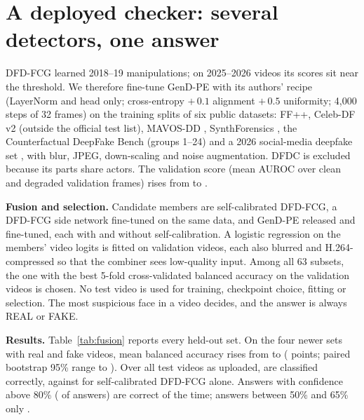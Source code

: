 \documentclass[11pt]{article}
\begin{document}
\begin{table}[t]
  \centering\small
  \caption{Self-calibration applied unchanged to GenD (released FF++ checkpoints). Real videos called fake at 0.5, and
  AUROC, before $\rightarrow$ after. FF++ test: 70 real; DFDC part 0: 40 real. Strong blur = GB$_5$, heavy H.264 =
  VC$_5$ (authors' code).}
  \label{tab:transfer}
  \TabTransfer
\end{table}

\section{A deployed checker: several detectors, one answer}
\label{sec:fusion}
DFD-FCG learned 2018--19 manipulations; on 2025--2026 videos its scores sit near the threshold. We therefore fine-tune
GenD-PE with its authors' recipe (LayerNorm and head only; cross-entropy $+\,0.1$ alignment $+\,0.5$ uniformity; 4{,}000
steps of 32 frames) on the training splits of six public datasets: FF++, Celeb-DF v2 (outside the official test list),
MAVOS-DD \cite{mavosdd}, SynthForensics \cite{synthforensics}, the Counterfactual DeepFake Bench \cite{cfbench} (groups
1--24) and a 2026 social-media deepfake set \cite{socialdeepfakes}, with blur, JPEG, down-scaling and noise
augmentation. DFDC is excluded because its parts share actors. The validation score (mean AUROC over clean and degraded validation frames) rises from \PeftValBase{} to
\PeftValBest{}.

\textbf{Fusion and selection.} Candidate members are self-calibrated DFD-FCG, a DFD-FCG side network fine-tuned on the
same data, and GenD-PE released and fine-tuned, each with and without self-calibration. A logistic regression on the
members' video logits is fitted on \NVal{} validation videos, each also blurred and H.264-compressed so that the
combiner sees low-quality input. Among all 63 subsets, the one with the best 5-fold cross-validated balanced accuracy
on the validation videos is chosen. No test video is used for training, checkpoint choice, fitting or selection. The
most suspicious face in a video decides, and the answer is always REAL or FAKE.

\textbf{Results.} Table~\ref{tab:fusion} reports every held-out set. On the four newer sets with real and fake videos,
mean balanced accuracy rises from \NewBaseBacc{} to \NewFinBacc{} (\NewGain{} points; paired bootstrap 95\% range
\NewCiLo{} to \NewCiHi{}). Over all \AllN{} test videos as uploaded, \AllAcc{} are classified correctly, against
\AllAccBase{} for self-calibrated DFD-FCG alone. Answers with confidence above 80\% (\BandCShare{} of answers) are
correct \BandCAcc{} of the time; answers between 50\% and 65\% only \BandAAcc{}.
\end{document}
